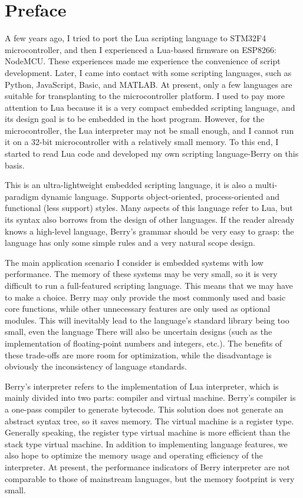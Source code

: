 \chapter* {Preface}

\pagestyle{empty}
\thispagestyle{empty}

A few years ago, I tried to port the Lua scripting language to STM32F4 microcontroller, and then I experienced a Lua-based firmware on ESP8266: NodeMCU. These experiences made me experience the convenience of script development. Later, I came into contact with some scripting languages, such as Python, JavaScript, Basic, and MATLAB. At present, only a few languages   are suitable for transplanting to the microcontroller platform. I used to pay more attention to Lua because it is a very compact embedded scripting language, and its design goal is to be embedded in the host program. However, for the microcontroller, the Lua interpreter may not be small enough, and I cannot run it on a 32-bit microcontroller with a relatively small memory. To this end, I started to read Lua code and developed my own scripting language-Berry on this basis.

This is an ultra-lightweight embedded scripting language, it is also a multi-paradigm dynamic language. Supports object-oriented, process-oriented and functional (less support) styles. Many aspects of this language refer to Lua, but its syntax also borrows from the design of other languages. If the reader already knows a high-level language, Berry's grammar should be very easy to grasp: the language has only some simple rules and a very natural scope design.

The main application scenario I consider is embedded systems with low performance. The memory of these systems may be very small, so it is very difficult to run a full-featured scripting language. This means that we may have to make a choice. Berry may only provide the most commonly used and basic core functions, while other unnecessary features are only used as optional modules. This will inevitably lead to the language's standard library being too small, even the language There will also be uncertain designs (such as the implementation of floating-point numbers and integers, etc.). The benefits of these trade-offs are more room for optimization, while the disadvantage is obviously the inconsistency of language standards.

Berry's interpreter refers to the implementation of Lua interpreter, which is mainly divided into two parts: compiler and virtual machine. Berry's compiler is a one-pass compiler to generate bytecode. This solution does not generate an abstract syntax tree, so it saves memory. The virtual machine is a register type. Generally speaking, the register type virtual machine is more efficient than the stack type virtual machine. In addition to implementing language features, we also hope to optimize the memory usage and operating efficiency of the interpreter. At present, the performance indicators of Berry interpreter are not comparable to those of mainstream languages, but the memory footprint is very small.

